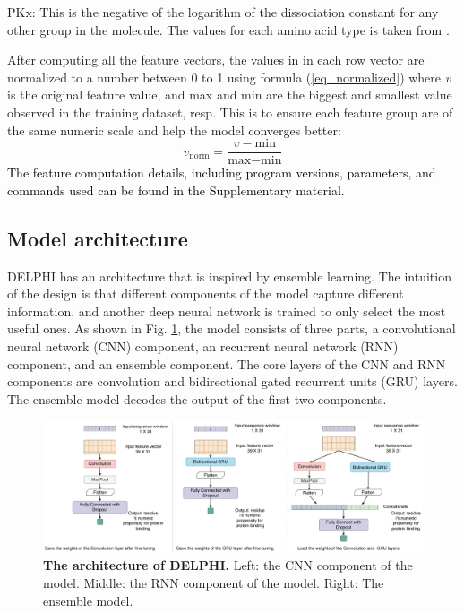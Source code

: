 \documentclass{bioinfo}
\newcommand{\myColor}{black}
\begin{document}
\begin{methods}
PKx: This is the negative of the logarithm of the dissociation constant for any other group in the molecule. The values for each amino acid type is taken from \citep{zhang2019sequence}.

After computing all the feature vectors, the values in in each row vector are normalized to a number between 0 to 1 using formula (\ref{eq_normalized}) where \textit{v} is the original feature value, and max and min are the biggest and smallest value observed in the training dataset, resp. This is to ensure each feature group are of the same numeric scale and help the model converges better:
\begin{equation}
v_\text{norm}=\dfrac{v-\text{min}}{\text{max}-\text{min}}\label{eq_normalized}
\end{equation}
\textcolor{\myColor}{The feature computation details, including program versions, parameters, and commands used can be found in the Supplementary material.}

\subsection{Model architecture}
DELPHI has an architecture that is inspired by ensemble learning. The intuition of the design is that different components of the model capture different information, and another deep neural network is trained to only select the most useful ones. As shown in Fig. \ref{fig_architecture}, the model consists of three parts, a convolutional neural network (CNN) component, an recurrent neural network (RNN) component, and an ensemble component. The core layers of the CNN and RNN components are convolution and bidirectional gated recurrent units (GRU) layers. The ensemble model decodes the output of the first two components.  
\begin{figure}
\centering
\includegraphics[width=\textwidth]{Model_architecture.pdf}
  \caption{\textbf{The architecture of DELPHI.} Left: the CNN component of the model. Middle: the RNN component of the model. Right: The ensemble model. 
  \label{fig_architecture}}
\end{figure}


\end{methods}
\end{document}
